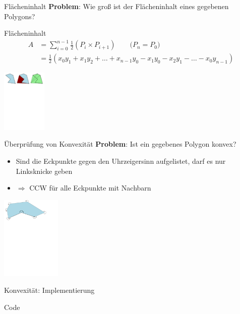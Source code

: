 \begin{frame}{Flächeninhalt}
	\textbf{Problem}: Wie groß ist der Flächeninhalt eines gegebenen Polygons?

	\pause

	\begin{block}{Flächeninhalt}
		\begin{align*}
			A &= \sum_{i=0}^{n-1} \frac{1}{2} (P_i \times P_{i+1})\qquad \textit{($P_n = P_0$)} \\
			  &= \frac{1}{2} ( x_0 y_1 + x_1 y_2 + \ldots + x_{n-1} y_0 - x_1 y_0 - x_2 y_1 - \ldots - x_0 y_{n-1})
		\end{align*}
	\end{block}

	\begin{center}
		\includegraphics[keepaspectratio,height=3cm]{polygon_area.pdf}
	\end{center}
\end{frame}

\begin{frame}{Überprüfung von Konvexität}
	\textbf{Problem}: Ist ein gegebenes Polygon konvex?
	\begin{itemize}
		\item Sind die Eckpunkte gegen den Uhrzeigersinn aufgelistet, darf es nur Linksknicke geben
		\item $\Rightarrow$ CCW für alle Eckpunkte mit Nachbarn
	\end{itemize}

	\begin{center}
		\includegraphics[keepaspectratio,height=4cm]{polygon_concave.pdf}
	\end{center}
\end{frame}

\begin{frame}{Konvexität: Implementierung}
	\begin{exampleblock}{Code}
		\lstset{
			language=C++,
			tabsize=2
		}
		
	\end{exampleblock}
\end{frame}

